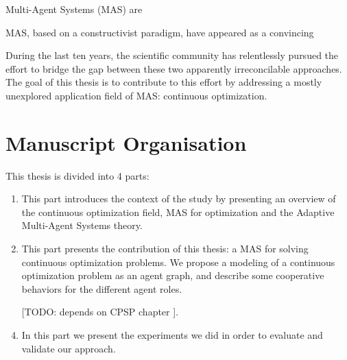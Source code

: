  \label{introduction}

Multi-Agent Systems (MAS) are 

MAS, based on a constructivist paradigm, have appeared as a convincing 

During the last ten years, the scientific community has relentlessly pursued the effort to bridge the gap between these two apparently irreconcilable approaches. The goal of this thesis is to contribute to this effort by addressing a mostly unexplored application field of MAS: continuous optimization.



\section*{Manuscript Organisation}
This thesis is divided into 4 parts:
\begin{enumerate}[P{a}rt I.] %
\item This part introduces the context of the study by presenting an overview of the continuous optimization field, MAS for optimization and the Adaptive Multi-Agent Systems theory.
\item This part presents the contribution of this thesis: a MAS for solving continuous optimization problems. We propose a modeling of a continuous optimization problem as an agent graph, and describe some cooperative behaviors for the different agent roles.
\item [[TODO: depends on CPSP chapter]].
\item In this part we present the experiments we did in order to evaluate and validate our approach.

\end{enumerate}